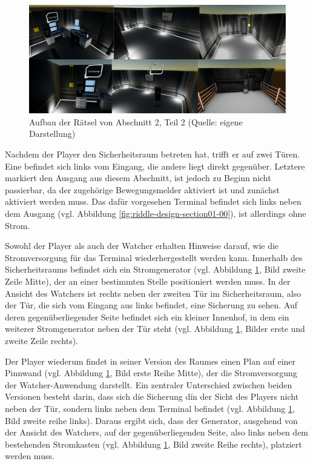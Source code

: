 \begin{figure}[ht]
\centering
\includegraphics[width=1\linewidth]{content/pictures/Rätseldesign - Abschnitt01 - Rätsel01.png}
\caption{Aufbau der Rätsel von Abschnitt 2, Teil 2 (Quelle: eigene Darstellung)}
\label{fig:riddle-design-section01-01}
\end{figure}

Nachdem der Player den Sicherheitsraum betreten hat, trifft er auf zwei Türen. Eine befindet sich links vom Eingang, die andere liegt direkt gegenüber. Letztere markiert den Ausgang aus diesem Abschnitt, ist jedoch zu Beginn nicht passierbar, da der zugehörige Bewegungsmelder aktiviert ist und zunächst aktiviert werden muss. Das dafür vorgesehen Terminal befindet sich links neben dem Ausgang (vgl. Abbildung \ref{fig:riddle-design-section01-00}), ist allerdings ohne Strom.

Sowohl der Player als auch der Watcher erhalten Hinweise darauf, wie die Stromversorgung für das Terminal wiederhergestellt werden kann. Innerhalb des Sicherheitsraums befindet sich ein Stromgenerator (vgl. Abbildung \ref{fig:riddle-design-section01-01}, Bild zweite Zeile Mitte), der an einer bestimmten Stelle positioniert werden muss. In der Ansicht des Watchers ist rechts neben der zweiten Tür im Sicherheitsraum, also der Tür, die sich vom Eingang aus links befindet, eine Sicherung zu sehen. Auf deren gegenüberliegender Seite befindet sich ein kleiner Innenhof, in dem ein weiterer Stromgenerator neben der Tür steht (vgl. Abbildung \ref{fig:riddle-design-section01-01}, Bilder erste und zweite Zeile rechts).

Der Player wiederum findet in seiner Version des Raumes einen Plan auf einer Pinnwand (vgl. Abbildung \ref{fig:riddle-design-section01-01}, Bild erste Reihe Mitte), der die Stromversorgung der Watcher-Anwendung darstellt. Ein zentraler Unterschied zwischen beiden Versionen besteht darin, dass sich die Sicherung dín der Sicht des Players nicht neben der Tür, sondern links neben dem Terminal befindet (vgl. Abbildung \ref{fig:riddle-design-section01-01}, Bild zweite reihe links). Daraus ergibt sich, dass der Generator, ausgehend von der Ansicht des Watchers, auf der gegenüberliegenden Seite, also links neben dem bestehenden Stromkasten (vgl. Abbildung \ref{fig:riddle-design-section01-01}, Bild zweite Reihe rechts), platziert werden muss.

